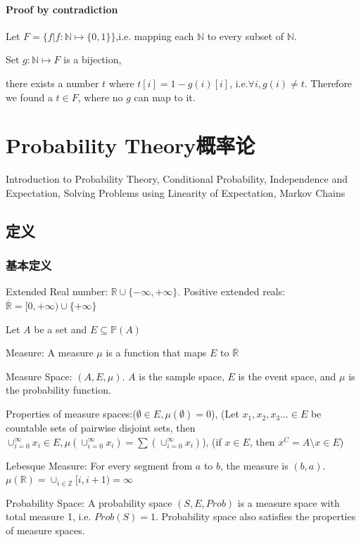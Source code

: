 \documentclass[12pt,a4paper]{ctexrep}
\begin{document}
\subsubsection{Proof by contradiction}
Let $F = \{f|f:\mathbb{N}\mapsto\{0,1\}\}$,i.e. mapping each $\mathbb{N}$ to every subset of $\mathbb{N}$.

Set $g:\mathbb{N}\mapsto F$ is a bijection, 

there exists a number $t$ where $t[i] = 1-g(i)[i]$, i.e.$\forall i, g(i) \neq t$. Therefore we found a $t \in F$, where no $g$ can map to it. 

\chapter{Probability Theory概率论}
Introduction to Probability Theory, Conditional Probability, Independence and Expectation, Solving Problems using Linearity of Expectation, Markov Chains
\section{定义}
\subsection{基本定义}
Extended Real number: $\mathbb{R}\cup \{-\infty,+\infty\}$. Positive extended reals:$\overline{\mathbb{R}} = [0,+\infty) \cup \{+\infty\}$

Let $A$ be a set and $E \subseteq \mathbb{P}(A)$

Measure: A measure $\mu$ is a function that maps $E$ to $\overline{\mathbb{R}}$

Measure Space: $(A,E,\mu)$. $A$ is the sample space, $E$ is the event space, and $\mu$ is the probability function.

Properties of measure spaces:($\emptyset \in E, \mu(\emptyset) = 0$), (Let $x_1,x_2,x_3\dots \in E$ be countable sets of pairwise disjoint sets, then $\cup_{i=0}^{\infty} x_i\in E, \mu(\cup_{i=0}^{\infty} x_i) = \sum(\cup_{i=0}^{\infty} x_i)$), (if $x \in E$, then $x^C = A \setminus x \in E$)

Lebesque Measure: For every segment from $a$ to $b$, the measure is $(b,a)$. $\mu(\mathbb{R}) = \cup_{i\in \mathbb{Z}} [i,i+1) = \infty$

Probability Space: A probability space $(S,E,Prob)$ is a measure space with total measure 1, i.e. $Prob(S) = 1$. Probability space also satisfies the properties of measure spaces.\\
\end{document}
